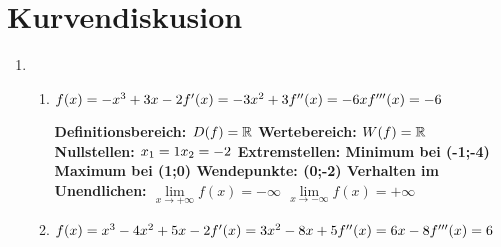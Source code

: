 \section{Kurvendiskusion}
  \begin{enumerate}
	\item %
	\begin{enumerate}
	\item
 $f(x)=-x^{3}+3x-2 \newline
 f'(x)=-3x^2+3 \newline
 f''(x)=-6x \newline
 f'''(x)=-6 \newline$
 \par
 \bfseries Definitionsbereich: $\normalfont D(f)=\mathbb{R}$ \newline
 \bfseries Wertebereich: $\normalfont W(f)=\mathbb{R}$ \newline
 \bfseries Nullstellen: \normalfont \newline $ x_{1}=1 \newline x_{2}=-2  $\newline \newline
 \bfseries Extremstellen: \normalfont \newline 
 Minimum bei (-1;-4)  \newline
 Maximum bei (1;0) \newline \newline
 \bfseries Wendepunkte: \normalfont (0;-2)\newline 
 \bfseries Verhalten im Unendlichen: \normalfont \newline
 $\lim\limits_{x \rightarrow +\infty}{f(x)=-\infty}$ \newline
 $\lim\limits_{x \rightarrow -\infty}{f(x)=+\infty}$
 
 \par
 \item
  $f(x)=x^3-4x^2+5x-2 \newline
 f'(x)=3x^2-8x+5 \newline
 f''(x)=6x-8 \newline
 f'''(x)=6 \newline$
 

\end{enumerate}
\end{enumerate}
